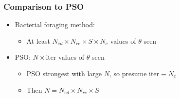 \documentclass{beamer}
\begin{document}
\begin{frame}
\frametitle{Comparison to PSO}
\begin{itemize}
  \item Bacterial foraging method:
  \begin{itemize}
    \item   At least $N_{ed} \times N_{re} \times S \times N_c$ values of $\theta$ seen
  \end{itemize}
  \item PSO: $N \times \text{iter}$ values of $\theta$ seen
  \begin{itemize}
    \item PSO strongest with large $N$, so presume $\text{iter} \equiv N_c$
    \item Then $N = N_{ed} \times N_{re} \times S$
  \end{itemize}
\end{itemize}
\end{frame}
\end{document}
